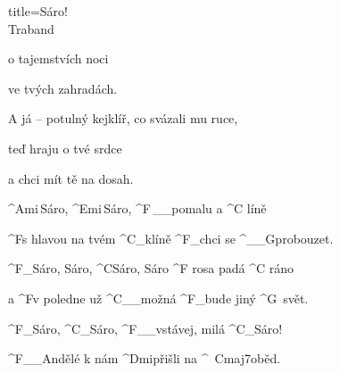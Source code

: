 \begin{song}{title=\centering Sáro! \\\normalsize Traband  \vspace*{-0.3cm}}
{\begin{minipage}[t]{0.48\textwidth}
	o tajemstvích noci
	
	ve tvých zahradách.
	
	A já -- potulný kejklíř, co svázali mu ruce,

	teď hraju o tvé srdce
	
	a chci mít tě na dosah.

\sloka
	^{Ami\,}Sáro, ^{Emi\,}Sáro, ^{F\,{\color{white}\_\_}}pomalu a ^{C\,\,}líně

	
	^{F}s hlavou na tvém ^{C{\color{white}\_}}klíně ^{F{\color{white}\_}}chci se ^{{\color{white}\_\_}G}probouzet.
	
	^{F{\color{white}\_}}Sáro, Sáro, ^{C}Sáro, Sáro ^{F\,\,}rosa padá ^{C\,\,}ráno
	
	a ^{F}v poledne už ^{C{\color{white}\_\_}}možná ^{F{\color{white}\_}}bude jiný ^{G\,\,\,}svět.

	^{F{\color{white}\_}}Sáro, ^{C{\color{white}\_}}Sáro, ^{F{\color{white}\_\_}}vstávej, milá ^{C{\color{white}\_}}Sáro!

	^{F{\color{white}\_\_}}Andělé k nám ^{Dmi}přišli na ^{\,\,\,Cmaj7}oběd.


\end{minipage}
}
\setcounter{Slokočet}{0}
\end{song}

